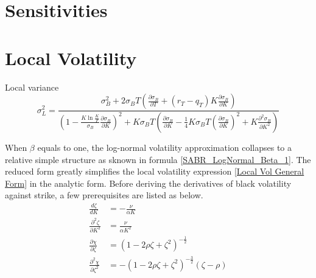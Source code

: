 \documentclass{article}
\begin{document}
\section{Sensitivities}



\section{Local Volatility}

Local variance
\begin{equation} \label{Local Vol General Form}
    \sigma_{L}^2 = \frac{\sigma_{B}^2 + 2 \sigma_{B} T \left(\frac{\partial \sigma_{B}}{\partial T} + (r_T - q_T) K \frac{\partial \sigma_{B}}{\partial K}\right)}{\left(1 - \frac{K \ln{\frac{K}{F}}}{\sigma_{B}} \frac{\partial \sigma_{B}}{\partial K}\right)^2 + K \sigma_{B} T \left(\frac{\partial \sigma_{B}}{\partial K} - \frac{1}{4} K \sigma_{B} T \left(\frac{\partial \sigma_{B}}{\partial K}\right)^2 + K \frac{\partial^2 \sigma_{B}}{\partial K^2}\right)}
\end{equation}

When $ \beta $ equals to one, the log-normal volatility approximation collapses to a relative simple structure as sknown in formula \ref{SABR_LogNormal_Beta_1}.
The reduced form greatly simplifies the local volatility expression \ref{Local Vol General Form} in the analytic form.
Before deriving the derivatives of black volatility against strike, a few prerequisites are listed as below.
\begin{subequations}
    \begin{align}
        \frac{d \zeta}{d K} &= -\frac{\nu}{\alpha K} \\
        \frac{\partial^2 \zeta}{\partial K^2} &= \frac{\nu}{\alpha K^2}\\
        \frac{\partial \chi}{\partial \zeta} &= \left(1 - 2 \rho \zeta + \zeta^2\right)^{-\frac{1}{2}}\\
        \frac{\partial^2 \chi}{\partial \zeta^2} &= -\left(1 - 2 \rho \zeta + \zeta^2\right)^{-\frac{3}{2}} \left(\zeta - \rho\right)
    \end{align}
\end{subequations}
\end{document}
